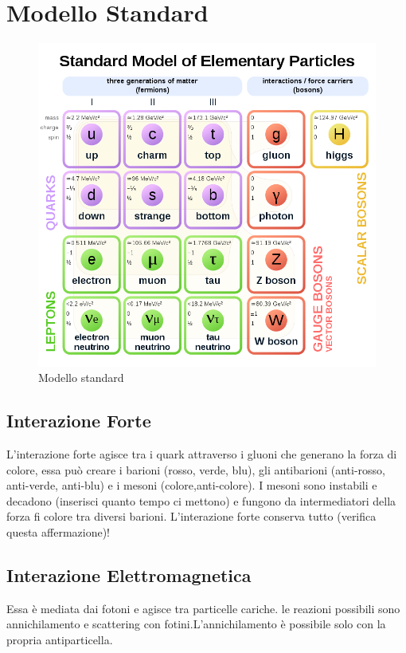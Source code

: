 \documentclass[11pt,a4paper]{report}
\begin{document}
	\section{Modello Standard}
	\begin{figure}[h]
		\centering
    	\includegraphics[width=\linewidth]{Immagini/Modello_standard.png}
		\caption{Modello standard}
		\label{fig:mod_std}
	\end{figure}
	\subsection{Interazione Forte}
		L'interazione forte agisce tra i quark attraverso i gluoni che generano la forza di colore, essa può creare i barioni (rosso, verde, blu), gli antibarioni (anti-rosso, anti-verde, anti-blu) e i mesoni (colore,anti-colore).\newline
		I mesoni sono instabili e decadono (inserisci quanto tempo ci mettono) e fungono da intermediatori della forza fi colore tra diversi barioni.\newline
		L'interazione forte conserva tutto (verifica questa affermazione)!
	\subsection{Interazione Elettromagnetica}
		Essa è mediata dai fotoni e agisce tra particelle cariche. le reazioni possibili sono annichilamento e scattering con fotini.L'annichilamento è possibile solo con la propria antiparticella.
\end{document}
